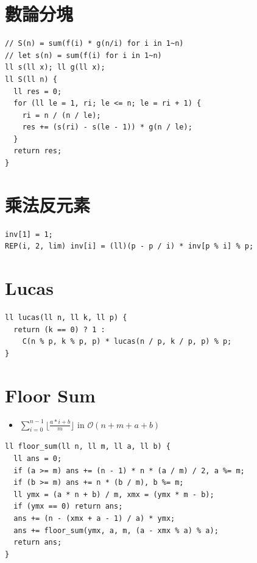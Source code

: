 \documentclass[10pt, a4paper, twocolumn]{article}
\begin{document}
\section{數論分塊}

\begin{verbatim}
// S(n) = sum(f(i) * g(n/i) for i in 1~n)
// let s(n) = sum(f(i) for i in 1~n)
ll s(ll x); ll g(ll x);
ll S(ll n) {
  ll res = 0;
  for (ll le = 1, ri; le <= n; le = ri + 1) {
    ri = n / (n / le);
    res += (s(ri) - s(le - 1)) * g(n / le);
  }
  return res;
}
\end{verbatim}

\section{乘法反元素}

\begin{verbatim}
inv[1] = 1;
REP(i, 2, lim) inv[i] = (ll)(p - p / i) * inv[p % i] % p;
\end{verbatim}

\section{Lucas}

\begin{verbatim}
ll lucas(ll n, ll k, ll p) {
  return (k == 0) ? 1 : 
    C(n % p, k % p, p) * lucas(n / p, k / p, p) % p;
}
\end{verbatim}

\section{Floor Sum}

\begin{itemize}[tight_item]
  \item $\sum^{n-1}_{i=0} \lfloor \frac{a * i + b}{m} \rfloor$ in $\mathcal{O}(n + m + a + b)$
\end{itemize}

\begin{verbatim}
ll floor_sum(ll n, ll m, ll a, ll b) {
  ll ans = 0;
  if (a >= m) ans += (n - 1) * n * (a / m) / 2, a %= m;
  if (b >= m) ans += n * (b / m), b %= m;
  ll ymx = (a * n + b) / m, xmx = (ymx * m - b);
  if (ymx == 0) return ans;
  ans += (n - (xmx + a - 1) / a) * ymx;
  ans += floor_sum(ymx, a, m, (a - xmx % a) % a);
  return ans;
}
\end{verbatim}

\newpage
\end{document}
